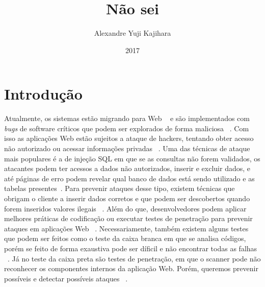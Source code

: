 \documentclass[brazil, utf8]{article}
\begin{document}
\title{Não sei}
\author{Alexandre Yuji Kajihara}
\date{2017}

\maketitle 

\section{Introdução}
Atualmente, os sistemas estão migrando para Web ~\cite{Cimapa2010} e são implementados com \textit{bugs}
 de software críticos que podem ser explorados de forma maliciosa ~\cite{Vieira2009}. Com isso as 
 aplicações Web estão sujeitos a ataque de hackers, tentando obter acesso não autorizado ou acessar 
 informações privadas ~\cite{Vieira2009}. Uma das técnicas de ataque mais populares é a de injeção SQL 
 em que se as consultas não forem validados, os atacantes podem ter acessos a dados não autorizados, 
 inserir e excluir dados, e até páginas de erro podem revelar qual banco de dados está sendo utilizado 
 e as tabelas presentes~\cite{Cimapa2010}. Para prevenir ataques desse tipo, existem técnicas que 
 obrigam o cliente a inserir dados corretos e que podem ser descobertos quando forem inseridos  valores 
 ilegais ~\cite{Vieira2009}. Além do que, desenvolvedores podem aplicar melhores práticas de codificação 
 ou executar testes de penetração para prevenir ataques em aplicações Web ~\cite{Vieira2009}. 
 Necessariamente, também existem alguns testes que podem ser feitos como o teste da caixa branca em que 
 se analisa códigos, porém se feito de forma exaustiva pode ser díficil e não encontrar todas as falhas 
 ~\cite{Vieira2009}. Já no teste da caixa preta são testes de penetração, em que o scanner pode não 
 reconhecer os componentes internos da aplicação Web. Porém, queremos prevenir possíveis e detectar 
 possíveis ataques ~\cite{Vieira2009}.




\end{document}
